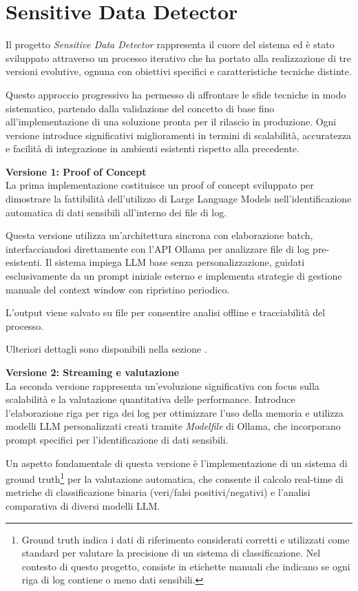 \documentclass[12pt]{report}
\begin{document}
%
%

\chapter{Sensitive Data Detector}
\label{chap:sensitive_data_detector}

Il progetto \textit{Sensitive Data Detector} rappresenta il cuore del sistema ed è stato sviluppato attraverso un processo iterativo che ha portato alla realizzazione di tre versioni evolutive, ognuna con obiettivi specifici e caratteristiche tecniche distinte.

Questo approccio progressivo ha permesso di affrontare le sfide tecniche in modo sistematico, partendo dalla validazione del concetto di base fino all'implementazione di una soluzione pronta per il rilascio in produzione. Ogni versione introduce significativi miglioramenti in termini di scalabilità, accuratezza e facilità di integrazione in ambienti esistenti rispetto alla precedente.

\textbf{Versione 1: Proof of Concept} \\
La prima implementazione costituisce un proof of concept sviluppato per dimostrare la fattibilità dell'utilizzo di Large Language Models nell'identificazione automatica di dati sensibili all'interno dei file di log.

Questa versione utilizza un'architettura sincrona con elaborazione batch, interfacciandosi direttamente con l'API Ollama per analizzare file di log pre-esistenti. Il sistema impiega LLM base senza personalizzazione, guidati esclusivamente da un prompt iniziale esterno e implementa strategie di gestione manuale del context window con ripristino periodico.

L'output viene salvato su file per consentire analisi offline e tracciabilità del processo.

Ulteriori dettagli sono disponibili nella sezione .

\textbf{Versione 2: Streaming e valutazione} \\
La seconda versione rappresenta un'evoluzione significativa con focus sulla scalabilità e la valutazione quantitativa delle performance. Introduce l'elaborazione riga per riga dei log per ottimizzare l'uso della memoria e utilizza modelli LLM personalizzati creati tramite \textit{Modelfile} di Ollama, che incorporano prompt specifici per l'identificazione di dati sensibili.

Un aspetto fondamentale di questa versione è l'implementazione di un sistema di ground truth\footnote{Ground truth indica i dati di riferimento considerati corretti e utilizzati come standard per valutare la precisione di un sistema di classificazione. Nel contesto di questo progetto, consiste in etichette manuali che indicano se ogni riga di log contiene o meno dati sensibili.} per la valutazione automatica, che consente il calcolo real-time di metriche di classificazione binaria (veri/falsi positivi/negativi) e l'analisi comparativa di diversi modelli LLM.
\end{document}
